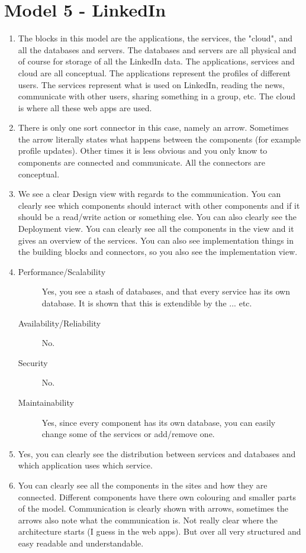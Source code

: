 \section{Model 5 - LinkedIn}
\begin{enumerate}
	\item The blocks in this model are the applications, the services, the "cloud", and all the databases and servers.
	The databases and servers are all physical and of course for storage of all the LinkedIn data.
	The applications, services and cloud are all conceptual. The applications represent the profiles of different users.
	The services represent what is used on LinkedIn, reading the news, communicate with other users, sharing something in a group, etc.
	The cloud is where all these web apps are used.
	
	\item There is only one sort connector in this case, namely an arrow. 
	Sometimes the arrow literally states what happens between the components (for example profile updates).
	Other times it is less obvious and you only know to components are connected and communicate.
	All the connectors are conceptual.
	
	\item We see a clear Design view with regards to the communication.
	You can clearly see which components should interact with other components and if it should be a read/write action or something else.
	You can also clearly see the Deployment view.
	You can clearly see all the components in the view and it gives an overview of the services.
	You can also see implementation things in the building blocks and connectors, so you also see the implementation view.
	
	\item 
	\begin{description}
		\item[Performance/Scalability] Yes, you see a stash of databases, and that every service has its own database. 
		It is shown that this is extendible by the ... etc.
		\item[Availability/Reliability] No.
		\item[Security] No.
		\item[Maintainability] Yes, since every component has its own database, you can easily change some of the services or add/remove one.
	\end{description}
	
	\item Yes, you can clearly see the distribution between services and databases and which application uses which service.
	
	\item You can clearly see all the components in the sites and how they are connected.
	Different components have there own colouring and smaller parts of the model.
	Communication is clearly shown with arrows, sometimes the arrows also note what the communication is.
	Not really clear where the architecture starts (I guess in the web apps).
	But over all very structured and easy readable and understandable.
\end{enumerate}